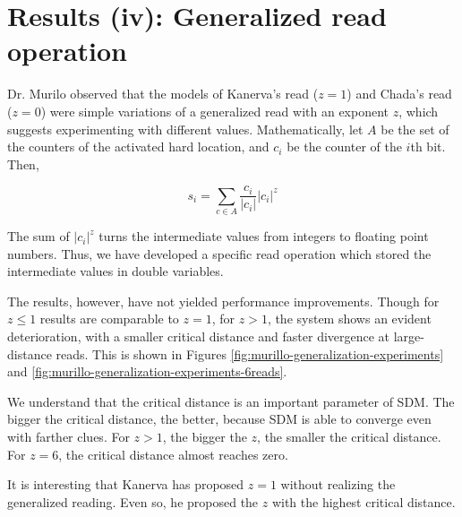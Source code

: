 \chapter{Results (iv): Generalized read operation}

Dr. Murilo observed that the models of Kanerva's read ($z=1$) and Chada's read ($z=0$) were simple variations of a generalized read with an exponent $z$, which suggests experimenting with different values. Mathematically, let $A$ be the set of the counters of the activated hard location, and $c_i$ be the counter of the $i$th bit. Then,

$$
s_i = \sum_{c \in A} \frac{c_i}{|c_i|} |c_i|^z
$$

The sum of $|c_i|^z$ turns the intermediate values from integers to floating point numbers. Thus, we have developed a specific read operation which stored the intermediate values in double variables.

The results, however, have not yielded performance improvements. Though for $z \leq 1$ results are comparable to $z=1$, for $z>1$, the system shows an evident deterioration, with a smaller critical distance and faster divergence at large-distance reads. This is shown in Figures \ref{fig:murillo-generalization-experiments} and \ref{fig:murillo-generalization-experiments-6reads}.

We understand that the critical distance is an important parameter of SDM. The bigger the critical distance, the better, because SDM is able to converge even with farther clues. For $z>1$, the bigger the $z$, the smaller the critical distance. For $z = 6$, the critical distance almost reaches zero.

It is interesting that Kanerva has proposed $z=1$ without realizing the generalized reading. Even so, he proposed the $z$ with the highest critical distance.

